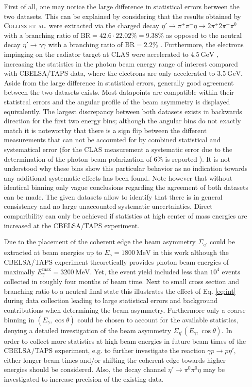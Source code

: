 First of all, one may notice the large difference in statistical errors between the two datasets. This can be explained by considering that the results obtained by \textsc{Collins et al.} \cite{collins} were extracted via the charged decay $\eta'\to\pi^+\pi^-\eta\to2\pi^+2\pi^-\pi^0$ with a branching ratio of $\text{BR}=42.6\cdot22.02\%=9.38\%$ \cite{pdg} as opposed to the neutral decay $\eta'\to\gamma\gamma$ with a branching ratio of $\text{BR}=2.2\%$ \cite{pdg}. Furthermore, the electrons impinging on the radiator target at CLAS were accelerated to  $\SI{4.5}{\giga\eV}$ \cite{collins}, increasing the statistics in the photon beam energy range of interest compared with CBELSA/TAPS data, where the electrons are only accelerated to  $\SI{3.5}{\giga\eV}$. Aside from the large difference in statistical errors, generally good agreement between the two datasets exists. Most datapoints are compatible within their statistcal errors and the angular profile of the beam asymmetry is displayed equivalently. The largest discrepancy between both datasets exists in backwards direction for the first two energy bins;  although the angular bins do not exactly match it is noteworthy that there is a sign flip between the different measurements that can not be accounted for by combined statistical and systematical error (for the CLAS measurement a systematic error due to the determination of the photon beam polarization of $6\%$ is reported \cite{collins}). It is not understood why these bins show this particular behavior as no indication towards any additional systematic effects has been found. Note however that without identical binning only vague conclusions regarding the agreement of both datasets can be made. The given datasets allow to identify that there is in general consistency and no large unaccounted systematic uncertainties. Direct comparibility can only be achieved if statistics at high center of mass energies are increased at the CBELSA/TAPS experiment. 

Due to the placement of the coherent edge the beam asymmetry $\Sigma_{\eta'}$ could be extracted at beam energies up to $E_\gamma=\SI{1800}{\mega\eV}$ in this work although the CBELSA/TAPS experiment theoretically provides photon beam energies of maximally $E_\gamma^\text{max}=\SI{3200}{\mega\eV}$. Yet, the event yield included less than $10^4$ events collected in roughly four months of beam time. Next to small cross section and branching ratio to a neutral final state this illustrates the effect of Eq. \ref{eq:int} during data collection leading to large statistical errors and background contributions when determining the beam asymmetry. Furthermore only a coarse binning in $\left(E_\gamma,\cos\theta\right)$ could be chosen to account for the available statistics, denying a detailed investigation of the beam asymmetry $\Sigma_{\eta'}\left(E_\gamma,\cos\theta\right)$. In order to collect more statistics at high beam energies in future beam times of the CBELSA/TAPS experiment, e.g. to further investigate the reaction $\gamma p\to p\eta'$, either longer beam times and/or shifting the coherent edge towards higher energies should be considered. Also, the decay channel $\eta'\to\pi^0\pi^0\eta$ may be investigated to increase precision of the existing data.
